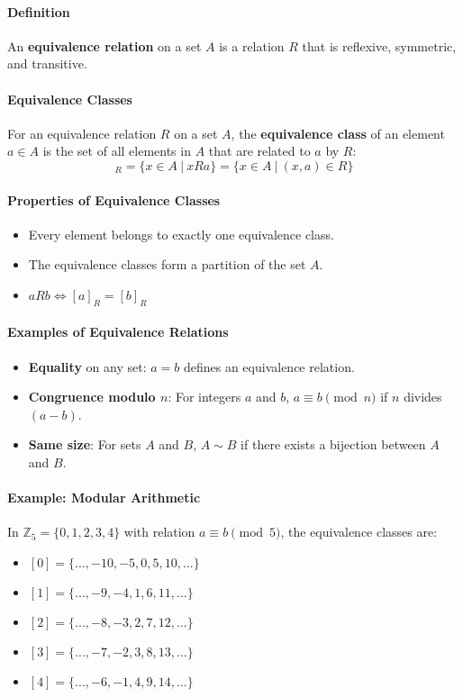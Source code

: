 \paragraph*{Definition}
An \textbf{equivalence relation} on a set $A$ is a relation $R$ that is reflexive, symmetric, and transitive.

\paragraph*{Equivalence Classes}
For an equivalence relation $R$ on a set $A$, the \textbf{equivalence class} of an element $a \in A$ is the set of all elements in $A$ that are related to $a$ by $R$:
\begin{equation*}
    [a]_R = \{x \in A\ |\ xRa\} = \{x \in A\ |\ (x,a) \in R\}
\end{equation*}

\paragraph*{Properties of Equivalence Classes}
\begin{itemize}
    \item Every element belongs to exactly one equivalence class.
    \item The equivalence classes form a partition of the set $A$.
    \item $a R b \iff [a]_R = [b]_R$
\end{itemize}

\paragraph*{Examples of Equivalence Relations}
\begin{itemize}
    \item \textbf{Equality} on any set: $a = b$ defines an equivalence relation.
    \item \textbf{Congruence modulo $n$}: For integers $a$ and $b$, $a \equiv b \pmod{n}$ if $n$ divides $(a-b)$. 
    \item \textbf{Same size}: For sets $A$ and $B$, $A \sim B$ if there exists a bijection between $A$ and $B$.
\end{itemize}

\paragraph*{Example: Modular Arithmetic}
In $\mathbb{Z}_5 = \{0, 1, 2, 3, 4\}$ with relation $a \equiv b \pmod{5}$, the equivalence classes are:
\begin{itemize}
    \item $[0] = \{..., -10, -5, 0, 5, 10, ...\}$
    \item $[1] = \{..., -9, -4, 1, 6, 11, ...\}$
    \item $[2] = \{..., -8, -3, 2, 7, 12, ...\}$
    \item $[3] = \{..., -7, -2, 3, 8, 13, ...\}$
    \item $[4] = \{..., -6, -1, 4, 9, 14, ...\}$
\end{itemize}

